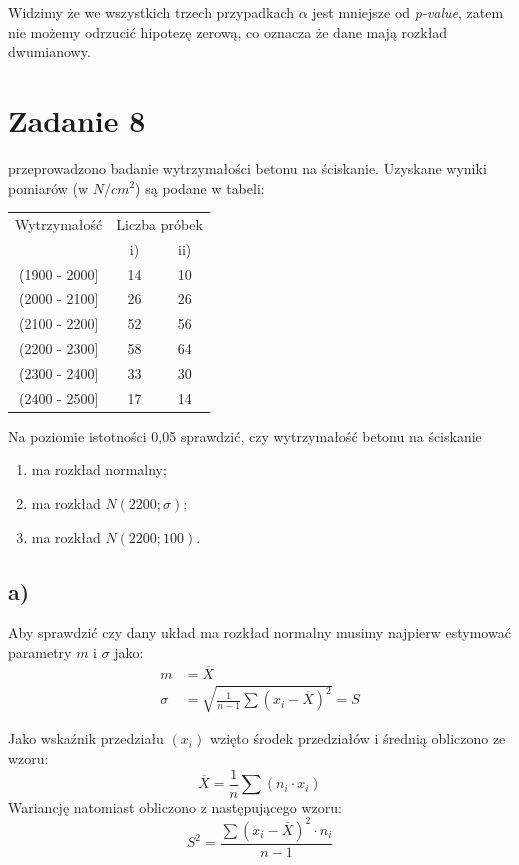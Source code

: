 \documentclass{article}
\begin{document}
Widzimy że we wszystkich trzech przypadkach $\alpha$ jest mniejsze od \textit{p-value}, zatem nie możemy odrzucić hipotezę zerową, co oznacza że dane mają rozkład dwumianowy.

\newpage
\section{Zadanie 8}
przeprowadzono badanie wytrzymałości betonu na ściskanie. Uzyskane wyniki pomiarów (w $N/{cm}^2$) są podane w tabeli:
\begin{center} \begin{tabular}{|c|c|c|} \hline
Wytrzymałość & \multicolumn{2}{c|}{Liczba próbek} \\ \cline{2-3}
& i) & ii) \\ \hline
(1900 - 2000] & 14 & 10 \\ \hline
(2000 - 2100] & 26 & 26 \\ \hline
(2100 - 2200] & 52 & 56 \\ \hline
(2200 - 2300] & 58 & 64 \\ \hline
(2300 - 2400] & 33 & 30 \\ \hline
(2400 - 2500] & 17 & 14 \\ \hline
\end{tabular} \end{center}
Na poziomie istotności 0,05 sprawdzić, czy wytrzymałość betonu na ściskanie
\begin{enumerate}[label = \alph*)]
\item ma rozkład normalny;
\item ma rozkład $N(2200; \sigma)$;
\item ma rozkład $N(2200; 100)$.
\end{enumerate} 

\subsection{a)}
Aby sprawdzić czy dany układ ma rozkład normalny musimy najpierw estymować parametry $m$ i $\sigma$ jako:
\begin{align*}
m & = \overline{X}\\
\sigma & = \sqrt{ \frac{1}{n-1} \sum(x_i - \overline{X})^2} = S
\end{align*}

Jako wskaźnik przedziału $(x_i)$ wzięto środek przedziałów i średnią obliczono ze wzoru:
\[ \overline{X} = \frac{1}{n} \sum(n_i \cdot x_i)\]
Wariancję natomiast obliczono z następującego wzoru:
\[ S^2 = \frac{\sum (x_i - \overline{X})^2 \cdot n_i}{n-1} \]
\end{document}
